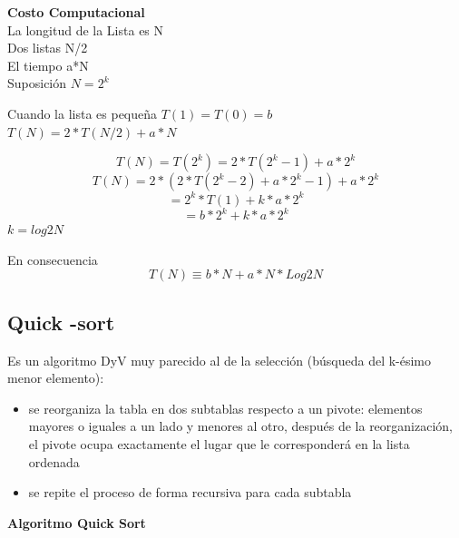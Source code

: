 \documentclass{article}
\begin{document}
\textbf{Costo Computacional}\\
La longitud de la Lista es N\\
Dos listas N/2\\
El tiempo a*N\\
Suposición $N = 2^k$

Cuando la lista es pequeña  $T(1) = T(0)= b$\\
$T(N) = 2* T(N/2) + a* N$

\begin{equation}
T(N) = T(2^k) = 2*T(2^k-1)+a*2^k
\end{equation}
\begin{equation}
T(N) = 2 * (2 * T(2^k-2) + a* 2^k-1) + a * 2^k
\end{equation}
\begin{equation}
= 2^k*T(1)+k*a*2^k
\end{equation}
\begin{equation}
= b*2^k+k*a*2^k
\end{equation}
$k = log2 N$

En consecuencia
\begin{equation}
T(N)\equiv b*N+a*N*Log2 N
\end{equation}
\subsection{Quick -sort}
Es un algoritmo DyV muy parecido al de la selección (búsqueda del k-ésimo menor elemento):
\begin{itemize}
    \item se reorganiza la tabla en dos subtablas respecto a un pivote: elementos mayores o iguales a un lado y menores al otro, después de la reorganización, el pivote ocupa exactamente el lugar que le corresponderá en la lista ordenada
    \item se repite el proceso de forma recursiva para cada subtabla
\end{itemize}

\textbf{Algoritmo Quick Sort}\\
\end{document}
